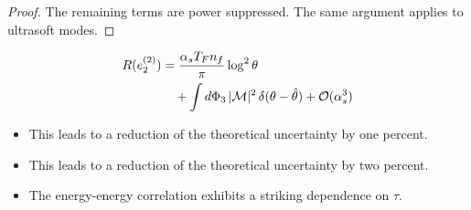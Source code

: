 \begin{proof}
The remaining terms are power suppressed. The same argument applies to
ultrasoft modes.
\end{proof}

\begin{align}
  R(e_2^{(2)}) &= \frac{\alpha_s T_F n_f}{\pi} \log^2 \theta \nonumber \\
  &\quad + \int d\Phi_{3} \, |\mathcal{M}|^2 \, \delta(\theta - \hat{\theta}) + \mathcal{O}(\alpha_s^3) \label{eq:6}
\end{align}

\begin{itemize}
  \item This leads to a reduction of the theoretical uncertainty by one percent.
  \item This leads to a reduction of the theoretical uncertainty by two percent.
  \item The energy-energy correlation exhibits a striking dependence on $\tau$.
\end{itemize}

